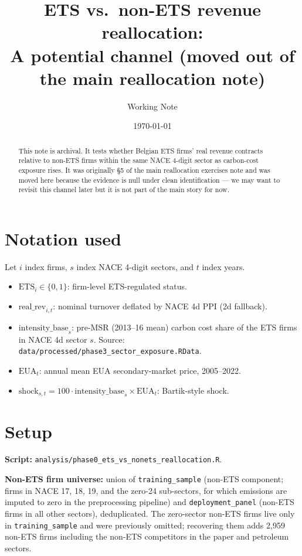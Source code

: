 \documentclass[11pt]{article}
\title{ETS vs.\ non-ETS revenue reallocation:\\
\large A potential channel (moved out of the main reallocation note)}
\author{Working Note}
\date{\today}
\begin{document}
\maketitle

\begin{abstract}
This note is archival. It tests whether Belgian ETS firms' real revenue contracts relative to non-ETS firms within the same NACE 4-digit sector as carbon-cost exposure rises. It was originally §5 of the main reallocation exercises note and was moved here because the evidence is null under clean identification --- we may want to revisit this channel later but it is not part of the main story for now.
\end{abstract}

\section{Notation used}

Let $i$ index firms, $s$ index NACE 4-digit sectors, and $t$ index years.
\begin{itemize}
  \item $\mathrm{ETS}_i \in \{0,1\}$: firm-level ETS-regulated status.
  \item $\mathrm{real\_rev}_{i,t}$: nominal turnover deflated by NACE 4d PPI (2d fallback).
  \item $\mathrm{intensity\_base}_s$: pre-MSR (2013--16 mean) carbon cost share of the ETS firms in NACE 4d sector $s$. Source: \texttt{data/processed/phase3\_sector\_exposure.RData}.
  \item $\mathrm{EUA}_t$: annual mean EUA secondary-market price, 2005--2022.
  \item $\mathrm{shock}_{s,t} = 100 \cdot \mathrm{intensity\_base}_s \times \mathrm{EUA}_t$: Bartik-style shock.
\end{itemize}

\section{Setup}

\textbf{Script:} \texttt{analysis/phase0\_ets\_vs\_nonets\_reallocation.R}.

\textbf{Non-ETS firm universe:} union of \texttt{training\_sample} (non-ETS component; firms in NACE 17, 18, 19, and the zero-24 sub-sectors, for which emissions are imputed to zero in the preprocessing pipeline) and \texttt{deployment\_panel} (non-ETS firms in all other sectors), deduplicated. The zero-sector non-ETS firms live only in \texttt{training\_sample} and were previously omitted; recovering them adds 2{,}959 non-ETS firms including the non-ETS competitors in the paper and petroleum sectors.
\end{document}
